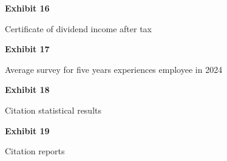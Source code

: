 \documentclass{article}
\begin{document}
% 


\vspace*{\fill}
\begin{center}

{\LARGE \bf
Exhibit 16
}

\vspace{10\baselineskip}

{\large  Certificate of dividend income after tax}

\end{center}
\vspace*{\fill}

% 

% 


\vspace*{\fill}
\begin{center}

{\LARGE \bf
Exhibit 17
}

\vspace{10\baselineskip}

{\large Average survey for five years experiences employee in 2024}

\end{center}
\vspace*{\fill}

% 

\vspace*{\fill}
\begin{center}

{\LARGE \bf
Exhibit 18
}

\vspace{10\baselineskip}

{\large Citation statistical results}

\end{center}
\vspace*{\fill}

% 


\vspace*{\fill}
\begin{center}

{\LARGE \bf
Exhibit 19
}

\vspace{10\baselineskip}

{\large Citation reports}

\end{center}
\vspace*{\fill}
\end{document}
